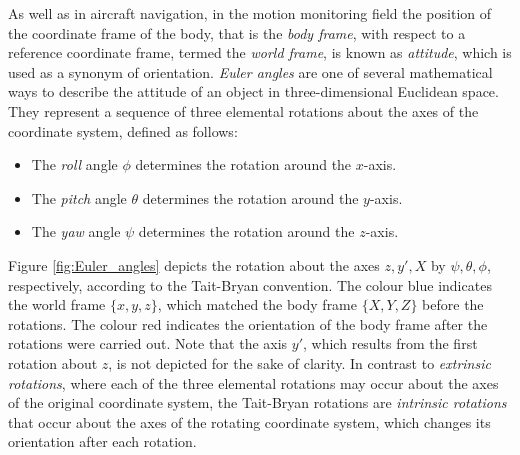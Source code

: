 As well as in aircraft navigation, in the motion monitoring field the position of the coordinate frame of the body, that is the \emph{body frame}, with respect to a reference coordinate frame, termed the \emph{world frame}, is known as \emph{attitude}, which is used as a synonym of orientation. \emph{Euler angles} are one of several mathematical ways to describe the attitude of an object in three-dimensional Euclidean space. They represent a sequence of three elemental rotations about the axes of the coordinate system, defined as follows:

\begin{itemize}
\item The \emph{roll} angle $\phi$ determines the rotation around the $x$-axis.
\item The \emph{pitch} angle $\theta$ determines the rotation around the $y$-axis.
\item The \emph{yaw} angle $\psi$ determines the rotation around the $z$-axis.
\end{itemize}

\noindent
Figure \ref{fig:Euler_angles} depicts the rotation about the axes $z, y', X$ by $\psi, \theta, \phi$, respectively, according to the Tait-Bryan convention. The colour blue indicates the world frame $\{x, y, z\}$, which matched the body frame $\{X, Y, Z\}$ before the rotations. The colour red indicates the orientation of the body frame after the rotations were carried out. Note that the axis $y'$, which results from the first rotation about $z$, is not depicted for the sake of clarity. In contrast to \emph{extrinsic rotations}, where each of the three elemental rotations may occur about the axes of the original coordinate system, the Tait-Bryan rotations are \emph{intrinsic rotations} that occur about the axes of the rotating coordinate system, which changes its orientation after each rotation.

